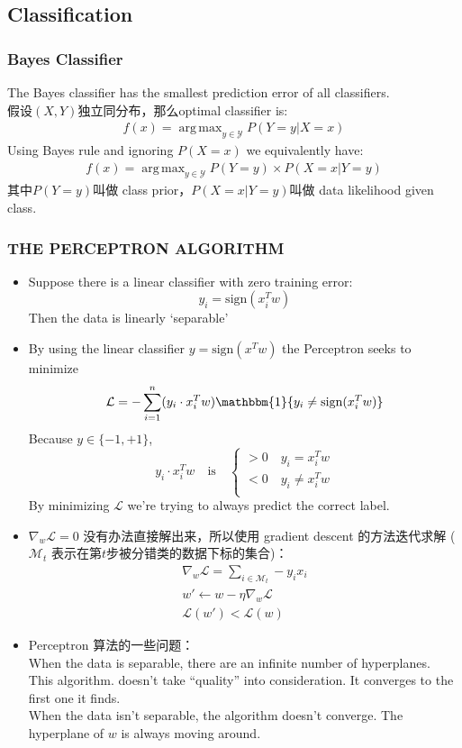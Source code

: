 \documentclass{article} 	%
\DeclareMathOperator*{\argmax}{arg\,max}
\begin{document}
	\subsection{Classification}
		\subsubsection{Bayes Classifier}
			The Bayes classifier has the smallest prediction error of all classifiers.\\
			假设$(X,Y)$独立同分布，那么optimal classifier is:
			\begin{eqnarray}
			f(x) = \argmax_{y\in \mathcal{Y}} P(Y=y|X=x)
			\end{eqnarray}
 			Using Bayes rule and ignoring $P(X = x)$ we equivalently have: 
			\begin{eqnarray}
			f(x) = \argmax_{y\in \mathcal{Y}} P(Y=y)\times P(X=x|Y=y)
			\end{eqnarray}
			其中$P(Y=y)$叫做 class prior，$P(X=x|Y=y)$叫做 data likelihood given class.
		\subsubsection{THE PERCEPTRON ALGORITHM}
			\begin{itemize}
			\item
			Suppose there is a linear classifier with zero training error:
			$$y_i = \mathrm{sign}(x_i^Tw)$$
			Then the data is linearly ‘separable’\\
			\item
			By using the linear classifier $y = \mathrm{sign}(x^Tw)$ the Perceptron seeks to minimize
			$$\mathcal{L} = -\sum_{i=1}^n(y_{i}\cdot x_i^Tw)\mathbbm{1} \{y_i\not = \mathrm{sign}(x_i^Tw)\}$$
			Because $y\in \{-1,+1\}$,
			\[
			y_i\cdot x_i^Tw \quad \mathrm{is}\quad
			\left \{ 
			\begin{array}{c}
			> 0\quad y_i = x_i^Tw\\
			< 0\quad y_i \not= x_i^Tw\\
			\end{array}
			\right .
			\]
			By minimizing $\mathcal{L}$ we’re trying to always predict the correct label.
			\item
			$\nabla_w\mathcal{L} = 0 $ 没有办法直接解出来，所以使用 gradient descent 的方法迭代求解
			($\mathcal{M}_t$ 表示在第$t$步被分错类的数据下标的集合)：
			\begin{eqnarray}
			\nabla_w\mathcal{L} = \sum_{i \in \mathcal{M}_t} -y_ix_i\\
			w'\gets w -\eta \nabla_w\mathcal{L} \\
			\mathcal{L}(w')<\mathcal{L}(w)
			\end{eqnarray}
			\item
			Perceptron 算法的一些问题：\\
			When the data is separable, there are an infinite number of hyperplanes.\\
			This algorithm. doesn’t take “quality” into consideration. It converges to the first one it finds.\\
			When the data isn’t separable, the algorithm doesn’t converge. The hyperplane of $w$ is always moving around.\\
			\end{itemize}
\end{document}
